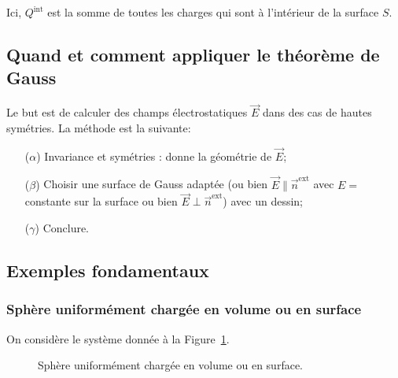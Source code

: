             Ici, $Q^{\text{int}}$ est la somme de toutes les charges qui sont à l'intérieur de la surface $S$.

    \subsection{Quand et comment appliquer le théorème de Gauss}

        Le but est de calculer des champs électrostatiques $\vec{E}$ dans des cas de hautes symétries. La méthode est la suivante:
        \begin{itemize}
            \item [($\alpha$)] Invariance et symétries : donne la géométrie de $\vec{E}$;
            \item [($\beta$)] Choisir une surface de Gauss adaptée (ou bien $\vec{E}\parallel\vec{n}^{\text{ext}}$ avec $E=$constante sur la surface ou bien $\vec{E}\perp\vec{n}^{\text{ext}}$) avec un dessin;
            \item [($\gamma$)] Conclure.
        \end{itemize}

    \subsection{Exemples fondamentaux}
        \subsubsection{Sphère uniformément chargée en volume ou en surface}

            On considère le système donnée à la Figure~\ref{fig:sphere_uniformement_chargee_volume_surface}.
            \begin{figure}
                \centering
                \caption{Sphère uniformément chargée en volume ou en surface.}    
                \label{fig:sphere_uniformement_chargee_volume_surface}
            \end{figure}

